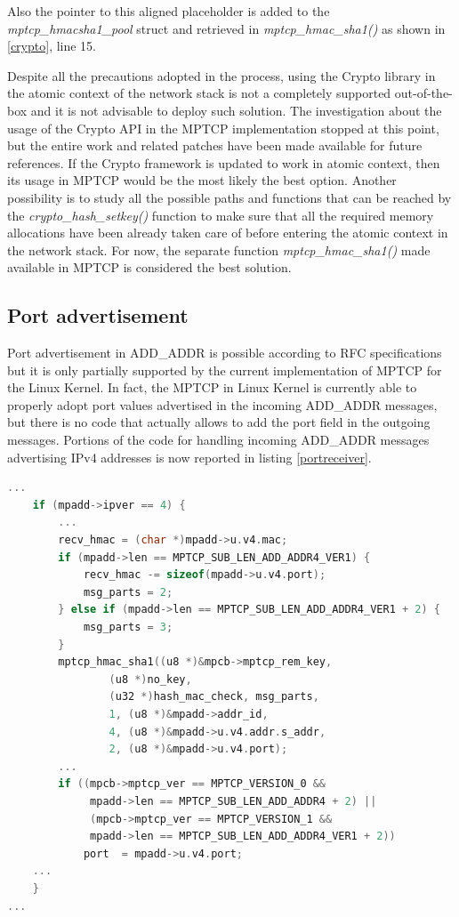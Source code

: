 Also the pointer to this aligned placeholder is added to the \textit{mptcp\_hmacsha1\_pool} struct and retrieved in \textit{mptcp\_hmac\_sha1()} as shown in \ref{crypto}, line 15. 


Despite all the precautions adopted in the process, using the Crypto library in the atomic context of the network stack is not a completely supported out-of-the-box and it is not advisable to deploy such solution. The investigation about the usage of the Crypto API in the MPTCP implementation stopped at this point, but the entire work and related patches have been made available for future references. If the Crypto framework is updated to work in atomic context, then its usage in MPTCP would be the most likely the best option. Another possibility is to study all the possible paths and functions that can be reached by the \textit{crypto\_hash\_setkey()} function to make sure that all the required memory allocations have been already taken care of before entering the atomic context in the network stack. For now, the separate function \textit{mptcp\_hmac\_sha1()} made available in MPTCP is considered the best solution.


\subsection{Port advertisement}
\label{portad}
Port advertisement in ADD\_ADDR is possible according to RFC specifications but it is only partially supported by the current implementation of MPTCP for the Linux Kernel. In fact, the MPTCP in Linux Kernel is currently able to properly adopt port values advertised in the incoming ADD\_ADDR messages, but there is no code that actually allows to add the port field in the outgoing messages.
Portions of the code for handling incoming ADD\_ADDR messages advertising IPv4 addresses is now reported in listing \ref{portreceiver}.

\begin{lstlisting}[language=c, caption=\textit{Handling port field in ADD\_ADDR2 at the receiver}, label=portreceiver]
    ...
	if (mpadd->ipver == 4) {
        ...
		recv_hmac = (char *)mpadd->u.v4.mac;
		if (mpadd->len == MPTCP_SUB_LEN_ADD_ADDR4_VER1) {
			recv_hmac -= sizeof(mpadd->u.v4.port);
			msg_parts = 2;
		} else if (mpadd->len == MPTCP_SUB_LEN_ADD_ADDR4_VER1 + 2) {
			msg_parts = 3;
		}
		mptcp_hmac_sha1((u8 *)&mpcb->mptcp_rem_key,
				(u8 *)no_key,
				(u32 *)hash_mac_check, msg_parts,
				1, (u8 *)&mpadd->addr_id,
				4, (u8 *)&mpadd->u.v4.addr.s_addr,
				2, (u8 *)&mpadd->u.v4.port);
		...
		if ((mpcb->mptcp_ver == MPTCP_VERSION_0 &&
		     mpadd->len == MPTCP_SUB_LEN_ADD_ADDR4 + 2) ||
		     (mpcb->mptcp_ver == MPTCP_VERSION_1 &&
		     mpadd->len == MPTCP_SUB_LEN_ADD_ADDR4_VER1 + 2))
			port  = mpadd->u.v4.port;
	...	
	}
...
\end{lstlisting}

